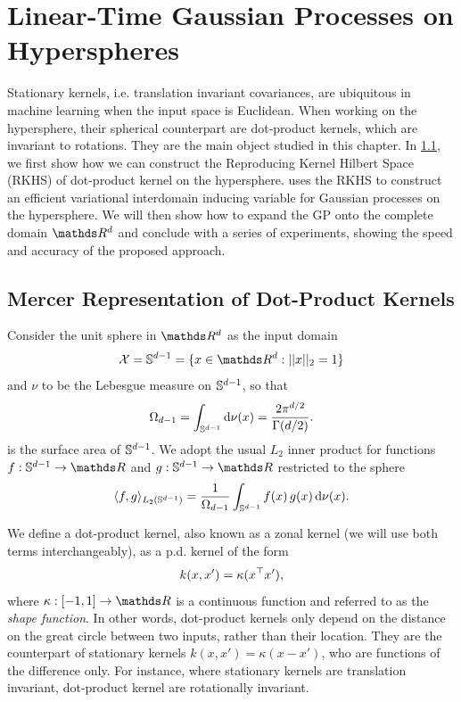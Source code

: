 \ifpdf
    \graphicspath{{Chapter3/Figs/Vector/}{Chapter3/Figs/PDF/}{Chapter3/Figs/}}
\else
    \graphicspath{{Chapter3/Figs/Raster/}{Chapter3/Figs/}}
\fi


\chapter{Linear-Time Gaussian Processes on Hyperspheres}
\label{chapter:vish}

Stationary kernels, i.e. translation invariant covariances, are ubiquitous in machine learning when the input space is Euclidean. When working on the hypersphere, their spherical counterpart are dot-product kernels, which are invariant to rotations. They are the main object studied in this chapter. In \cref{sec:rkhs-dotproduct-kernels}, we first show how we can construct the Reproducing Kernel Hilbert Space (RKHS) of dot-product kernel on the hypersphere.  uses the RKHS to construct an efficient variational interdomain inducing variable for Gaussian processes on the hypersphere. We will then show how to expand the GP onto the complete domain $\Reals^d$ and conclude with a series of experiments, showing the speed and accuracy of the proposed approach.

\section{Mercer Representation of Dot-Product Kernels}
\label{sec:rkhs-dotproduct-kernels}

Consider the unit sphere in $\Reals^d$  as the input domain
\begin{equation}
    \mathcal{X} = \dsphere = \{x \in \Reals^d: \norm{x}_2 = 1\}
\end{equation}
and $\nu$ to be the Lebesgue measure on $\mathbb{S}^{d-1}$, so that
\begin{equation}
    \Omega_{d-1} = \int_{\mathbb{S}^{d-1}} \mathrm{d}{\nu(x)} = \frac{2 \pi ^ {d/2}}{\Gamma(d/2)}.
\end{equation}
is the surface area of $\mathbb{S}^{d-1}$. We adopt the usual $L_2$ inner product for functions $f: \dsphere \rightarrow \Reals$ and $g: \dsphere \rightarrow \Reals$ restricted to the sphere 
\begin{equation}
     \langle f, g\rangle_{L_{2}(\mathbb{S}^{d-1})} = \frac{1}{\Omega_{d-1}} \int_{\mathbb{S}^{d-1}} f(x)\,g(x) \, \mathrm{d}{\nu(x)}.
\end{equation}

We define a dot-product kernel, also known as a zonal kernel (we will use both terms interchangeably), as a p.d. kernel of the form
\begin{equation}
    k(x, x') = \kappa(x^{\top} x'),
\end{equation}
where $\kappa: [-1, 1] \rightarrow \Reals$ is a continuous function and referred to as the \emph{shape function}. In other words, dot-product kernels only depend on the distance on the great circle between two inputs, rather than their location. They are the counterpart of stationary kernels $k(x, x') = \kappa(x - x')$, who are functions of the difference only. For instance, where stationary kernels are translation invariant, dot-product kernel are rotationally invariant.

